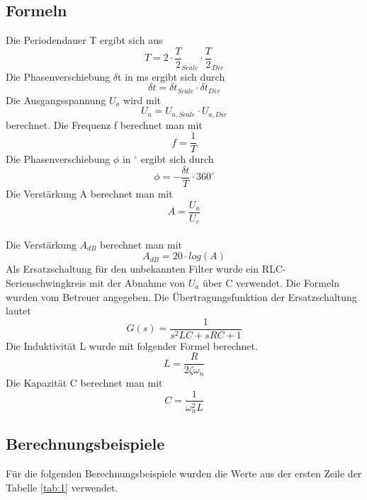 \documentclass[12pt,a4paper,ngerman]{article}
\begin{document}
\subsection{Formeln}
Die Periodendauer T ergibt sich aus
\begin{equation}
T = 2 \cdot \frac{T}{2}_{Scale} \cdot \frac{T}{2}_{Div}
\end{equation}
Die Phasenverschiebung $\delta$t in ms ergibt sich durch
\begin{equation}
\delta t = \delta t_{Scale} \cdot \delta t_{Div}
\end{equation}
Die Ausgangsspannung $U_a$ wird mit
\begin{equation}
U_a = U_{a,Scale} \cdot U_{a,Div}
\end{equation}
berechnet.
Die Frequenz f berechnet man mit
\begin{equation}
f = \frac{1}{T}
\end{equation}
Die Phasenverschiebung $\phi$ in $^\circ$ ergibt sich durch
\begin{equation}
\phi = - \frac{\delta t}{T} \cdot 360^\circ
\end{equation}
Die Verstärkung A berechnet man mit
\begin{equation}
A = \frac{U_a}{U_e}
\end{equation}\\
Die Verstärkung $A_{dB}$ berechnet man mit
\begin{equation}
A_{dB} = 20 \cdot log(A)
\end{equation}
Als Ersatzschaltung für den unbekannten Filter wurde ein RLC-Serienschwingkreis mit der Abnahme von $U_a$ über C verwendet. Die Formeln wurden vom Betreuer angegeben.
Die Übertragungsfunktion der Ersatzschaltung lautet
\begin{equation}
G(s) = \frac{1}{s^2 LC + sRC + 1}
\end{equation}
Die Induktivität L wurde mit folgender Formel berechnet.
\begin{equation}
L = \frac{R}{2 \zeta \omega_n}
\end{equation}
Die Kapazität C berechnet man mit 
\begin{equation}
C = \frac{1}{\omega_n^2L}
\end{equation}

\subsection{Berechnungsbeispiele}
Für die folgenden Berechnungsbeispiele wurden die Werte aus der ersten Zeile der Tabelle \ref{tab:1} verwendet.
\end{document}
